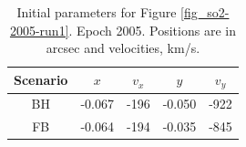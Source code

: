 \begin{table}[!p]
	\begin{center}
	\begin{tabular}{c c c c c}
	\hline
	\hline
	Scenario & $x$ & $v_x$ & $y$ & $v_y$\\
	\hline
	BH &  -0.067 & -196  & -0.050 & -922 \\
	FB &  -0.064 & -194  & -0.035 & -845 \\
	\hline
	\end{tabular}
	\end{center}
	\caption{Initial parameters for Figure \ref{fig_so2-2005-run1}. Epoch 2005. Positions are in arcsec and velocities, km/s.}
	\label{tab_so2-2005-run1}
\end{table}

